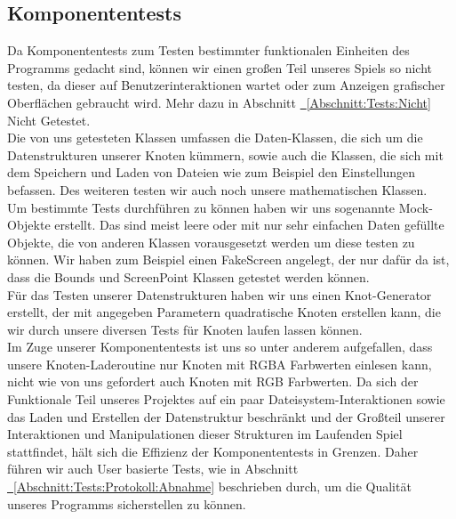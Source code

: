 %



\newpage



\label{Abschnitt:Tests:Protokoll:Komponenten}



\subsection*{Komponententests}


Da Komponententests zum Testen bestimmter funktionalen Einheiten des Programms gedacht sind, können wir einen großen Teil unseres Spiels so nicht testen, da dieser auf Benutzerinteraktionen wartet oder zum Anzeigen grafischer Oberflächen gebraucht wird. 
Mehr dazu in Abschnitt \hyperref[Abschnitt:Tests:Nicht:Komponenten]{\mousecursor~\ref{Abschnitt:Tests:Nicht}} \glqq Nicht Getestet\grqq.\\

Die von uns getesteten Klassen umfassen die Daten-Klassen, die sich um die Datenstrukturen unserer Knoten kümmern, sowie auch die Klassen, die sich mit dem Speichern und Laden von Dateien wie zum Beispiel den Einstellungen befassen.
Des weiteren testen wir auch noch unsere mathematischen Klassen.\\

Um bestimmte Tests durchführen zu können haben wir uns sogenannte Mock-Objekte erstellt. Das sind meist leere oder mit nur sehr einfachen Daten gefüllte Objekte, die von anderen Klassen vorausgesetzt werden um diese testen zu können. Wir haben zum Beispiel einen FakeScreen angelegt, der nur dafür da ist, dass die Bounds und ScreenPoint Klassen getestet werden können.\\

Für das Testen unserer Datenstrukturen haben wir uns einen Knot-Generator erstellt, der mit angegeben Parametern quadratische Knoten erstellen kann, die wir  durch unsere diversen Tests für Knoten laufen lassen können.\\

Im Zuge unserer Komponententests ist uns so unter anderem aufgefallen, dass unsere Knoten-Laderoutine nur Knoten mit RGBA Farbwerten einlesen kann, nicht wie von uns gefordert auch Knoten mit RGB Farbwerten. Da sich der Funktionale Teil unseres Projektes auf ein paar Dateisystem-Interaktionen sowie das Laden und Erstellen der Datenstruktur beschränkt und der Großteil unserer Interaktionen und Manipulationen dieser Strukturen im Laufenden Spiel stattfindet, hält sich die Effizienz der Komponententests in Grenzen. Daher führen wir auch User basierte Tests, wie in Abschnitt \hyperref[Abschnitt:Tests:Protokoll:Abnahme]{\mousecursor~\ref{Abschnitt:Tests:Protokoll:Abnahme}} beschrieben durch, um die Qualität unseres Programms sicherstellen zu können.

